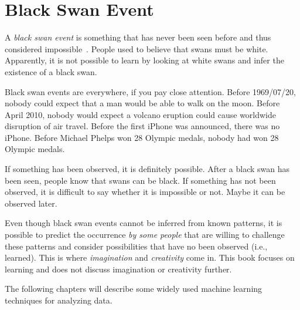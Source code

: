\section{Black Swan Event}

    
  A {\it black swan event} is something that has never been seen
  before and thus considered impossible~\cite{Taleb2010BlackSwan}.
  People used to believe that swans must be white. Apparently, it is
  not possible to learn by looking at white swans and infer the
  existence of a black swan.

  
  Black swan events are everywhere, if you pay close attention.
  Before 1969/07/20, nobody could expect that a man would be able to
  walk on the moon. Before April 2010, nobody would expect a volcano
  eruption could cause worldwide disruption of air travel.  Before the
  first iPhone was announced, there was no iPhone. Before Michael
  Phelps won 28 Olympic medals, nobody had won 28 Olympic medals.


  If something has been observed, it is definitely possible.  After a
  black swan has been seen, people know that swans can be black.  If
  something has not been observed, it is difficult to say whether it
  is impossible or not. Maybe it can be observed later.

  Even though black swan events cannot be inferred  from known patterns,
  it is possible to predict the occurrence {\it by some people} that
  are willing to challenge these patterns and consider
  possibilities that have no been observed (i.e., learned). This
  is where {\it imagination} and {\it creativity} come in.
  This book focuses on learning  and does not discuss imagination or
  creativity further.

  The following chapters will describe some widely used machine
  learning techniques for analyzing data.

    
  

